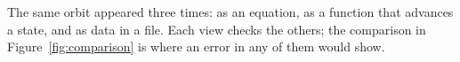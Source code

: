 The same orbit appeared three times: as an equation, as a function that
advances a state, and as data in a file.
Each view checks the others; the comparison in Figure~\ref{fig:comparison}
is where an error in any of them would show.
